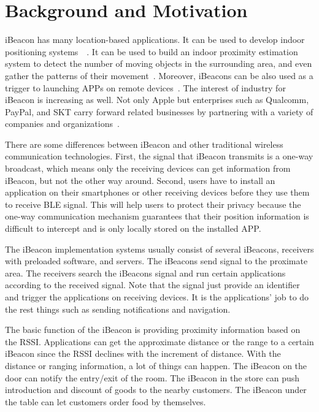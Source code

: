 \documentclass[12pt]{report}
\begin{document}
\section{Background and Motivation}
iBeacon has many location-based applications. It can be used to develop indoor positioning systems~\cite{mar}~\cite{gen15a}. It can be used to build an indoor proximity estimation system to detect the number of moving objects in the surrounding area, and even gather the patterns of their movement~\cite{cor}. Moreover, iBeacons can be also used as a trigger to launching APPs on remote devices~\cite{bas}. The interest of industry for iBeacon is increasing as well. Not only Apple but enterprises such as Qualcomm, PayPal, and SKT carry forward related businesses by partnering with a variety of companies and organizations~\cite{kim}.

There are some differences between iBeacon and other traditional wireless communication technologies. First, the signal that iBeacon transmits is a one-way broadcast, which means only the receiving devices can get information from iBeacon, but not the other way around. Second, users have to install an application on their smartphones or other receiving devices before they use them to receive BLE signal. This will help users to protect their privacy because the one-way communication mechanism guarantees that their position information is difficult to intercept and is only locally stored on the installed APP.

The iBeacon implementation systems usually consist of several iBeacons, receivers with preloaded software, and servers. The iBeacons send signal to the proximate area. The receivers search the iBeacons signal and run certain applications according to the received signal. Note that the signal just provide an identifier and trigger the applications on receiving devices. It is the applications' job to do the rest things such as sending notifications and navigation.

The basic function of the iBeacon is providing proximity information based on the RSSI. Applications can get the approximate distance or the range to a certain iBeacon since the RSSI declines with the increment of distance. With the distance or ranging information, a lot of things can happen. The iBeacon on the door can notify the entry/exit of the room. The iBeacon in the store can push introduction and discount of goods to the nearby customers. The iBeacon under the table can let customers order food by themselves. 
\end{document}
